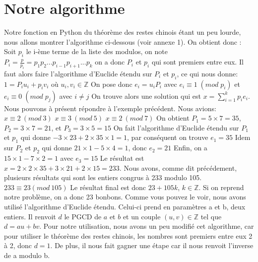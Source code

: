 \documentclass[a4paper, 11pt]{report}
\begin{document}
\newpage

\section{Notre algorithme}
Notre fonction en Python du théorème des restes chinois étant un peu lourde,
nous allons montrer l'algorithme ci-dessous (voir annexe 1).
On obtient donc :
\newline
Soit $p_i$ le i-ème terme de la liste des modulos, on note \newline
$ P_i=\frac{p}{p_i}=p_1 p_2 ... p_{i-1} p_{i+1} ... p_k $   \newline
on a donc $P_i$ et $p_i$  qui sont premiers entre eux. \newline
Il faut alors faire l'algorithme d'Euclide étendu sur $P_i$ et $p_i$, ce qui nous donne: 
$1= P_i u_i + p_i v_i$ 
où 
$u_i, v_i \in  \mathbb{Z}  $
\newline
On pose donc $e_i = u_i P_i$ avec $ e_i \equiv 1 \; (mod \; p_i)$ et $ e_i\equiv 0 \; (mod \; p_j)$ avec $ i\neq j$ \newline
On trouve alors une solution qui est $x=\sum_{i = 1}^{k}{p_i e_i} $.\newline
\newline
\newline
Nous pouvons à présent répondre à l'exemple précédent. Nous avions: \newline
$ x\equiv 2 \: (mod \:  3)$ 
\newline
$ x\equiv 3 \: (mod \: 5)$
\newline
$ x \equiv 2 \:(mod\: 7)$
\newline
On obtient $P_1=5\times 7=35$, $P_2=3\times 7=21 $, et $P_3=3\times 5=15$ \newline
On fait l'algorithme d'Euclide étendu sur $P_1$ et $p_1$ qui donne $-3\times 23 +2\times 35\times 1= 1 $, par conséquent on trouve $e_1= 35$ \newline
Idem sur $P_2$ et $p_2$ qui donne $21\times 1 - 5\times 4=1$, donc $e_2=21$ \newline
Enfin, on a $15\times 1- 7\times 2 = 1 $ avec $e_3=15$ \newline
Le résultat est $x=2 \times 2\times 35 + 3\times 21 + 2\times 15 =233$.
Nous avons, comme dit précédement, plusieurs résultats qui sont les entiers congrus à 233 modulo 105. \newline
$233\equiv 23 (mod \: 105)$ \newline
Le résultat final est donc $23+105k$, $k \in \mathbb{Z} $.
Si on reprend notre problème, on a donc 23 bonbons.
\newline
\newline
Comme vous pouvez le voir, nous avons utilisé l'algorithme d'Euclide étendu. Celui-ci prend en paramètres a et b, deux entiers.
Il renvoit $d$ le PGCD de $a$ et $b$ et un couple $(u,v) \in \mathbb{Z} $ tel que $d=au+bv$.
\newline
Pour notre utilisation, nous avons un peu modifié cet algorithme, car pour utiliser le théorème des restes chinois, les nombres sont premiers entre eux 2 à 2,
donc $d=1$. De plus, il nous fait gagner une étape car il nous renvoit l'inverse de a modulo b.
\end{document}
